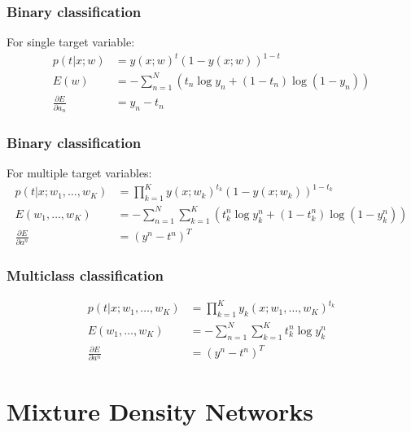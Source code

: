 \documentclass{beamer}
\begin{document}
\begin{frame}
    \frametitle{Binary classification}
    For single target variable:
    \begin{align*}
        p(t|x;w)&=y(x;w)^{t}(1-y(x;w))^{1-t} \\
        E(w)&=-\sum_{n=1}^{N}(t_{n}\log{}y_{n}+(1-t_{n})\log(1-y_{n})) \\
        \frac{\partial{}E}{\partial{}a_{n}}&=y_{n}-t_{n}
    \end{align*}
\end{frame}

\begin{frame}
    \frametitle{Binary classification}
    For multiple target variables:
    \begin{align*}
        p(t|x;w_{1},\hdots,w_{K})&=\prod_{k=1}^{K}y(x;w_{k})^{t_{k}}(1-y(x;w_{k}))^{1-t_{k}} \\
        E(w_{1},\hdots,w_{K})&=-\sum_{n=1}^{N}\sum_{k=1}^{K}(t^{n}_{k}\log{}y^{n}_{k}+(1-t^{n}_{k})\log(1-y^{n}_{k})) \\
        \frac{\partial{}E}{\partial{}a^{n}}&=(y^{n}-t^{n})^{T}
    \end{align*}
\end{frame}

\begin{frame}
    \frametitle{Multiclass classification}
    \begin{align*}
        p(t|x;w_{1},\hdots,w_{K})&=\prod_{k=1}^{K}y_{k}(x;w_{1},\hdots,w_{K})^{t_{k}} \\
        E(w_{1},\hdots,w_{K})&=-\sum_{n=1}^{N}\sum_{k=1}^{K}t^{n}_{k}\log{}y^{n}_{k} \\
        \frac{\partial{}E}{\partial{}a^{n}}&=(y^{n}-t^{n})^{T}
    \end{align*}
\end{frame}

\section{Mixture Density Networks}
\end{document}
